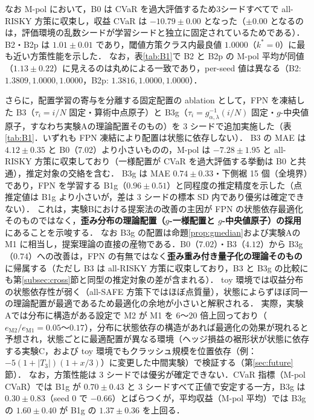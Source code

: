 \documentclass[a4paper,10pt]{jsarticle}
\theoremstyle{definition}
\begin{document}
なお M-pol において，B0 は CVaR を過大評価するため3シードすべてで all-RISKY 方策に収束し，収益 CVaR は $-10.79\pm0.00$ となった（$\pm0.00$ となるのは，評価環境の乱数シードが学習シードと独立に固定されているためである）．
B2・B2p は $1.01\pm0.01$ であり，閾値方策クラス内最良値 $1.0000$（$k^*=0$）に最も近い方策性能を示した．
なお，表\ref{tab:B1}で B2 と B2p の M-pol 平均が同値（$1.13\pm0.22$）に見えるのは丸めによる一致であり，per-seed 値は異なる（B2: $1.3809, 1.0000, 1.0000$，B2p: $1.3816, 1.0000, 1.0000$）．

さらに，配置学習の寄与を分離する固定配置の ablation として，FPN を凍結した B3（$\tau_i=i/N$ 固定・算術中点原子）と B3g（$\tau_i=g^{-1}_{\alpha,\lambda}(i/N)$ 固定・$g$-中央値原子，すなわち実験Aの理論配置そのもの）を 3 シードで追加実施した（表\ref{tab:B1}．いずれも FPN 凍結により配置は状態に依存しない）．
B3 の MAE は $4.12\pm0.35$ と B0（7.02）より小さいものの，M-pol は $-7.28\pm1.95$ と all-RISKY 方策に収束しており（一様配置が CVaR を過大評価する挙動は B0 と共通），推定対象の交絡を含む．
B3g は MAE $0.74\pm0.33$・下側裾 15 個（全境界）であり，FPN を学習する B1g（$0.96\pm0.51$）と同程度の推定精度を示した（点推定値は B1g より小さいが，差は 3 シードの標本 SD 内であり優劣は確定できない）．
これは，実験Bにおける提案法の改善の主因が FPN の状態依存最適化そのものではなく，\textbf{歪み分布の理論配置（$g$-一様配置と $g$-中央値原子）の採用}にあることを示唆する．
なお B3g の配置は命題\ref{prop:gmedian}および実験Aの M1 に相当し，提案理論の直接の産物である．B0（$7.02$）・B3（$4.12$）から B3g（$0.74$）への改善は，FPN の有無ではなく\textbf{歪み重み付き量子化の理論そのもの}に帰属する（ただし B3 は all-RISKY 方策に収束しており，B3 と B3g の比較にも第\ref{subsec:cross}節と同型の推定対象の差が含まれる）．
toy 環境では収益分布の状態依存性が弱く（all-SAFE 方策下ではほぼ点質量），状態によらずほぼ同一の理論配置が最適であるため最適化の余地が小さいと解釈される．
実際，実験Aでは分布に構造がある設定で M2 が M1 を $6$〜$20$ 倍上回っており（$e_{\mathrm{M2}}/e_{\mathrm{M1}}=0.05$〜$0.17$），分布に状態依存の構造があれば最適化の効果が現れると予想され，状態ごとに最適配置が異なる環境（ヘッジ損益の裾形状が状態に依存する実験C，および toy 環境でもクラッシュ規模を位置依存（例：$-5(1+|T_3|)(1+x/3)$）に変更した中間実験）で検証する（第\ref{sec:future}節）．
なお，方策性能は 3 シードでは優劣が確定できない．CVaR 指標（M-pol CVaR）では B1g が $0.70\pm0.43$ と 3 シードすべて正値で安定する一方，B3g は $0.30\pm0.83$（seed 0 で $-0.66$）とばらつくが，平均収益（M-pol 平均）では B3g の $1.60\pm0.40$ が B1g の $1.37\pm0.36$ を上回る．
\end{document}
